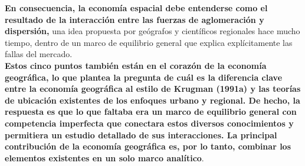 \textbf{En consecuencia, la economía espacial debe entenderse como el resultado de la interacción entre las fuerzas de aglomeración y dispersión,} una idea propuesta por geógrafos y científicos regionales hace mucho tiempo, dentro de un marco de equilibrio general que explica explícitamente las fallas del mercado.\\
\textbf{Estos cinco puntos también están en el corazón de la economía geográfica, lo que plantea la pregunta de cuál es la diferencia clave entre la economía geográfica al estilo de Krugman (1991a) y las teorías de ubicación existentes de los enfoques urbano y regional.  De hecho, la respuesta es que lo que faltaba era un marco de equilibrio general con competencia imperfecta que conectara estos diversos conocimientos y permitiera un estudio detallado de sus interacciones. La principal contribución de la economía geográfica es, por lo tanto, combinar los elementos existentes en un solo marco analítico}. 

